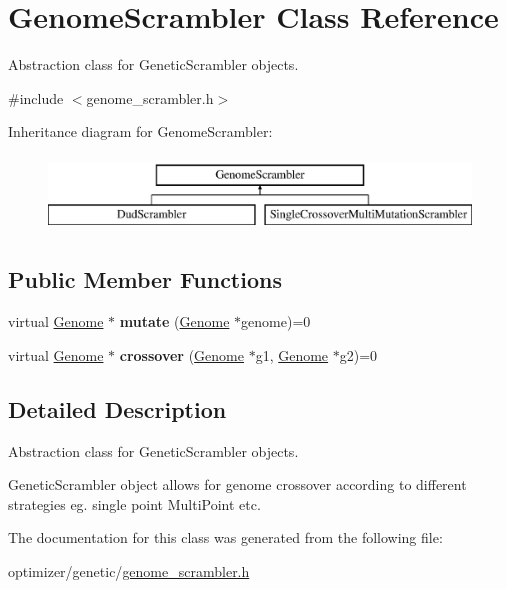 \hypertarget{class_genome_scrambler}{}\section{Genome\+Scrambler Class Reference}
\label{class_genome_scrambler}


Abstraction class for Genetic\+Scrambler objects.  




{\ttfamily \#include $<$genome\+\_\+scrambler.\+h$>$}

Inheritance diagram for Genome\+Scrambler\+:\begin{figure}[H]
\begin{center}
\leavevmode
\includegraphics[height=2.000000cm]{class_genome_scrambler}
\end{center}
\end{figure}
\subsection*{Public Member Functions}
\begin{DoxyCompactItemize}
\item 
\mbox{\label{class_genome_scrambler_a7937beaa7aa3c4a13c8c598ee0afca4a}} 
virtual \hyperlink{class_genome}{Genome} $\ast$ {\bfseries mutate} (\hyperlink{class_genome}{Genome} $\ast$genome)=0
\item 
\mbox{\label{class_genome_scrambler_a91f7407ea74f20ffc60d7af0de4e8e18}} 
virtual \hyperlink{class_genome}{Genome} $\ast$ {\bfseries crossover} (\hyperlink{class_genome}{Genome} $\ast$g1, \hyperlink{class_genome}{Genome} $\ast$g2)=0
\end{DoxyCompactItemize}


\subsection{Detailed Description}
Abstraction class for Genetic\+Scrambler objects. 

Genetic\+Scrambler object allows for genome crossover according to different strategies eg. single point Multi\+Point etc. 

The documentation for this class was generated from the following file\+:\begin{DoxyCompactItemize}
\item 
optimizer/genetic/\hyperlink{genome__scrambler_8h}{genome\+\_\+scrambler.\+h}\end{DoxyCompactItemize}

